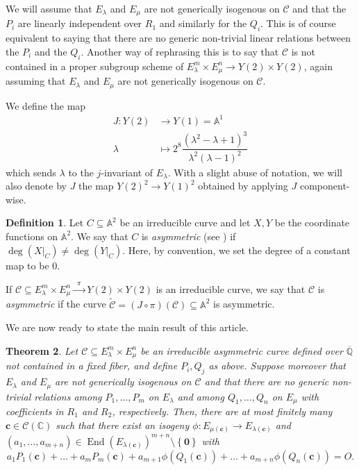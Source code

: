\documentclass[11pt,a4paper,reqno]{amsart}
\numberwithin{equation}{section}
\newcommand{\C}{\mathbb{C}}
\newcommand{\A}{\mathbb{A}}
\newcommand{\Qal}{\overline{\mathbb{Q}}}
\renewcommand{\c}{\mathcal{C}}
\newcommand{\cc}{\mathbf{c}}
\renewcommand{\l}{\lambda}
\newcommand{\m}{\mu}
\newcommand{\pt}[1]{\left( #1 \right)}
\newcommand{\pg}[1]{\left\lbrace #1 \right\rbrace}
\DeclareMathOperator{\en}{End}
\newtheorem{theorem}{Theorem}[section]
\theoremstyle{remark}
\theoremstyle{definition}
\theoremstyle{definition}
\newtheorem{definition}[theorem]{Definition}
\begin{document}
We will assume that $E_{\l}$ and $E_{\m}$ are not generically isogenous on $\c$ and that the $P_i$ are linearly independent over $R_1$ and similarly for the $Q_i$. This is of course equivalent to saying that there are no generic non-trivial linear relations between the $P_i$ and the $Q_i$. Another way of rephrasing this is to say that $\c$ is not contained in a proper subgroup scheme of $E_{\l}^m \times E_{\m}^n \rightarrow Y(2) \times Y(2)$, again assuming that $E_{\l}$ and $E_{\m}$ are not generically isogenous on $\c$.

We define the map 
\begin{align*}
J:Y(2) &\longrightarrow Y(1)=\A^1\\
\l &\longmapsto 2^8 \dfrac{(\l^2-\l+1)^3}{\l^2 (\l-1)^2}
\end{align*}
which sends $\l$ to the $j$-invariant of $E_{\l}$. With a slight abuse of notation, we will also denote by $J$ the map $Y(2)^2 \rightarrow Y(1)^2$ obtained by applying $J$ component-wise. 


\begin{definition}
Let $C \subseteq \A^{2}$ be an irreducible curve and let $X,Y$ be the coordinate functions on $\A^2$. We say that $C$ is \emph{asymmetric} (see \cite{Hab10}) if $\deg(X\vert_{C})\neq \deg(Y\vert_{C})$. Here, by convention, we set the degree of a constant map to be 0.

If $\c \subseteq E_{\l}^m \times E_{\m}^n \xrightarrow{\enspace\pi\enspace} Y(2) \times Y(2)$ is an irreducible curve, we say that $\c$ is \emph{asymmetric} if the curve $\widetilde{\c}=(J \circ \pi)(\c) \subseteq \A^2 $ is asymmetric.
\end{definition}

We are now ready to state the main result of this article.

\begin{theorem}\label{thm:main_thm_isog}
Let $\c \subseteq E_{\l}^m \times E_{\m}^n$ be an irreducible asymmetric curve defined over $\Qal$ not contained in a fixed fiber, and define $P_i, Q_j$ as above.
Suppose moreover that $E_{\l}$ and $E_{\m}$ are not generically isogenous on $\c$ and that there are no generic non-trivial relations among $P_1, \ldots, P_m$ on $E_{\l}$ and among $Q_1, \ldots, Q_n$ on $E_{\m}$ with coefficients in $R_1$ and $R_2$, respectively. Then, there are at most finitely many $\cc \in \c (\C)$ such that there exist an isogeny $\phi: E_{\m(\cc)} \rightarrow E_{\l(\cc)}$ and $(a_1, \ldots, a_{m+n}) \in \en(E_{\l(\cc)})^{m+n}\setminus \pg{\mathbf{0}}$ with $$a_1 P_1(\cc)+ \ldots +a_m P_m(\cc)+ a_{m+1} \phi \pt{Q_1(\cc)}+ \ldots + a_{m+n} \phi \pt{Q_n(\cc)}=O.$$
\end{theorem}
\end{document}
